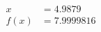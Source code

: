 \documentclass[preview]{standalone}
\begin{document}
\begin{align*}
x &= 4.9879\\f(x) &= 7.9999816
\end{align*}
\end{document}
